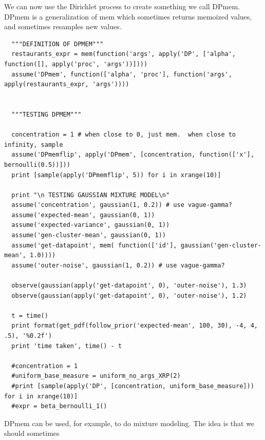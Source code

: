 \documentclass[11pt]{article}
\begin{document}
We can now use the Dirichlet process to create something we call DPmem.  DPmem is a generalization of mem which sometimes returns memoized values, and sometimes resamples new values.  

\begin{small}
\begin{verbatim}
  """DEFINITION OF DPMEM"""
  restaurants_expr = mem(function('args', apply('DP', ['alpha', function([], apply('proc', 'args'))])))
  assume('DPmem', function(['alpha', 'proc'], function('args', apply(restaurants_expr, 'args'))))


  """TESTING DPMEM"""

  concentration = 1 # when close to 0, just mem.  when close to infinity, sample 
  assume('DPmemflip', apply('DPmem', [concentration, function(['x'], bernoulli(0.5))]))
  print [sample(apply('DPmemflip', 5)) for i in xrange(10)]

  print "\n TESTING GAUSSIAN MIXTURE MODEL\n"
  assume('concentration', gaussian(1, 0.2)) # use vague-gamma? 
  assume('expected-mean', gaussian(0, 1)) 
  assume('expected-variance', gaussian(0, 1))
  assume('gen-cluster-mean', gaussian(0, 1))
  assume('get-datapoint', mem( function(['id'], gaussian('gen-cluster-mean', 1.0))))
  assume('outer-noise', gaussian(1, 0.2)) # use vague-gamma?

  observe(gaussian(apply('get-datapoint', 0), 'outer-noise'), 1.3)
  observe(gaussian(apply('get-datapoint', 0), 'outer-noise'), 1.2)

  t = time()
  print format(get_pdf(follow_prior('expected-mean', 100, 30), -4, 4, .5), '%0.2f')
  print 'time taken', time() - t

  #concentration = 1
  #uniform_base_measure = uniform_no_args_XRP(2)
  #print [sample(apply('DP', [concentration, uniform_base_measure])) for i in xrange(10)]
  #expr = beta_bernoulli_1()

\end{verbatim}
\end{small}


DPmem can be used, for example, to do mixture modeling.  The idea is that we should sometimes


\pagebreak

\begin{thebibliography}{99}



\end{thebibliography}
\end{document}
